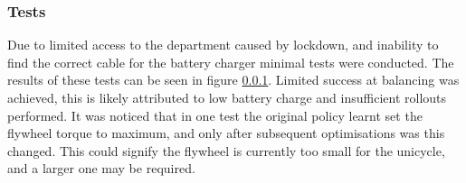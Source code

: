 \documentclass[twoside,twocolumn,12pt]{article}
\begin{document}
\twocolumn
\subsubsection{Tests}
Due to limited access to the department caused by lockdown, and inability to find the correct cable for the battery charger minimal tests were conducted. The results of these tests can be seen in figure \ref{}. Limited success at balancing was achieved, this is likely attributed to low battery charge and insufficient rollouts performed. It was noticed that in one test the original policy learnt set the flywheel torque to maximum, and only after subsequent optimisations was this changed. This could signify the flywheel is currently too small for the unicycle, and a larger one may be required.



\clearpage


\end{document}

